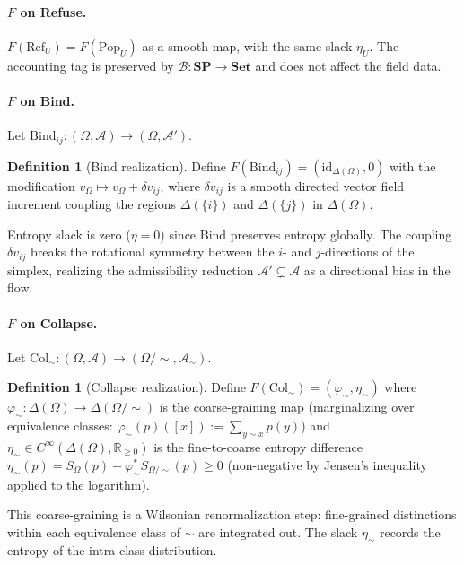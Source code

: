 \documentclass[12pt,a4paper]{article}
\theoremstyle{definition}
\newtheorem{definition}[theorem]{Definition}
\theoremstyle{remark}
\newcommand{\Rnn}{\mathbb{R}_{\ge 0}}
\newcommand{\SP}{\mathbf{SP}}
\providecommand{\id}{\mathrm{id}}
\renewcommand{\id}{\mathrm{id}}
\newcommand{\Pop}{\ensuremath{\mathrm{Pop}}}
\newcommand{\RefOp}{\ensuremath{\mathrm{Ref}}}
\newcommand{\Bind}{\ensuremath{\mathrm{Bind}}}
\newcommand{\Col}{\ensuremath{\mathrm{Col}}}
\newcommand{\vF}{v}
\newcommand{\SF}{S}
\begin{document}
\paragraph{$F$ on Refuse.}
$F(\RefOp_U)=F(\Pop_U)$ as a smooth map, with the same slack $\eta_U$. The accounting
tag is preserved by $\mathcal{B}:\SP\to\mathbf{Set}$ and does not affect the field data.

\paragraph{$F$ on Bind.}
Let $\Bind_{ij}:(\Omega,\mathcal{A})\to(\Omega,\mathcal{A}')$.

\begin{definition}[Bind realization]
\label{def:F-bind}
Define $F(\Bind_{ij})=(\id_{\Delta(\Omega)},0)$ with the modification
$\vF_\Omega\mapsto\vF_\Omega+\delta\vF_{ij}$, where $\delta\vF_{ij}$ is a smooth
directed vector field increment coupling the regions $\Delta(\{i\})$ and
$\Delta(\{j\})$ in $\Delta(\Omega)$.
\end{definition}

Entropy slack is zero ($\eta=0$) since $\Bind$ preserves entropy globally. The
coupling $\delta\vF_{ij}$ breaks the rotational symmetry between the $i$- and
$j$-directions of the simplex, realizing the admissibility reduction
$\mathcal{A}'\subsetneq\mathcal{A}$ as a directional bias in the flow.

\paragraph{$F$ on Collapse.}
Let $\Col_\sim:(\Omega,\mathcal{A})\to(\Omega/{\sim},\mathcal{A}_\sim)$.

\begin{definition}[Collapse realization]
\label{def:F-col}
Define $F(\Col_\sim)=(\varphi_\sim,\eta_\sim)$ where $\varphi_\sim:\Delta(\Omega)
\to\Delta(\Omega/{\sim})$ is the coarse-graining map (marginalizing over equivalence
classes: $\varphi_\sim(p)([x]):=\sum_{y\sim x}p(y)$) and $\eta_\sim\in C^\infty
(\Delta(\Omega),\Rnn)$ is the fine-to-coarse entropy difference $\eta_\sim(p)=
\SF_\Omega(p)-\varphi_\sim^*\SF_{\Omega/\sim}(p)\ge 0$ (non-negative by Jensen's
inequality applied to the logarithm).
\end{definition}

This coarse-graining is a Wilsonian renormalization step: fine-grained distinctions
within each equivalence class of $\sim$ are integrated out. The slack $\eta_\sim$
records the entropy of the intra-class distribution.
\end{document}
